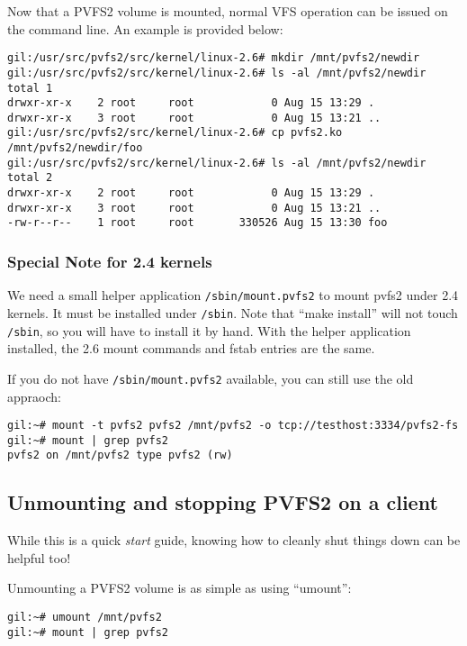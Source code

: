\documentclass[11pt, letterpaper]{article}
\begin{document}
Now that a PVFS2 volume is mounted, normal VFS operation can be issued
on the command line.  An example is provided below:

\begin{verbatim}
gil:/usr/src/pvfs2/src/kernel/linux-2.6# mkdir /mnt/pvfs2/newdir
gil:/usr/src/pvfs2/src/kernel/linux-2.6# ls -al /mnt/pvfs2/newdir
total 1
drwxr-xr-x    2 root     root            0 Aug 15 13:29 .
drwxr-xr-x    3 root     root            0 Aug 15 13:21 ..
gil:/usr/src/pvfs2/src/kernel/linux-2.6# cp pvfs2.ko
/mnt/pvfs2/newdir/foo
gil:/usr/src/pvfs2/src/kernel/linux-2.6# ls -al /mnt/pvfs2/newdir
total 2
drwxr-xr-x    2 root     root            0 Aug 15 13:29 .
drwxr-xr-x    3 root     root            0 Aug 15 13:21 ..
-rw-r--r--    1 root     root       330526 Aug 15 13:30 foo
\end{verbatim}

\subsubsection{Special Note for 2.4 kernels}

We need a small helper application \texttt{/sbin/mount.pvfs2} to mount pvfs2
under 2.4 kernels.   It must be installed under \texttt{/sbin}.  Note that
``make install'' will not touch \texttt{/sbin}, so you will have to install it
by hand.  With the helper application installed, the 2.6 mount commands and
fstab entries are the same.  

If you do not have \texttt{/sbin/mount.pvfs2} available, you can still use the
old appraoch:

\begin{verbatim}
gil:~# mount -t pvfs2 pvfs2 /mnt/pvfs2 -o tcp://testhost:3334/pvfs2-fs
gil:~# mount | grep pvfs2
pvfs2 on /mnt/pvfs2 type pvfs2 (rw)
\end{verbatim}


\subsection{Unmounting and stopping PVFS2 on a client}

While this is a quick \emph{start} guide, knowing how to cleanly shut
things down can be helpful too!

Unmounting a PVFS2 volume is as simple as using ``umount'':
\begin{verbatim}
gil:~# umount /mnt/pvfs2
gil:~# mount | grep pvfs2
\end{verbatim}
\end{document}

